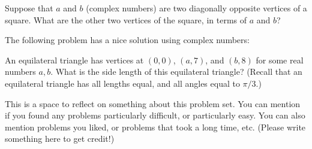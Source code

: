 \begin{problem}
  Suppose that $a$ and $b$ (complex numbers) are two diagonally opposite vertices of a square. What are the other two vertices of the square, in terms of $a$ and $b$?
\end{problem}

\begin{problem}
  The following problem has a nice solution using complex numbers:

  An equilateral triangle has vertices at $(0,0)$, $(a,7)$, and $(b,8)$ for some real numbers $a,b$. What is the side length of this equilateral triangle? (Recall that an equilateral triangle has all lengths equal, and all angles equal to $\pi/3$.)

\end{problem}

\begin{problem}
  This is a space to reflect on something about this problem set. You can mention if you found any problems particularly difficult, or particularly easy. You can also mention problems you liked, or problems that took a long time, etc. (Please write something here to get credit!)
\end{problem}
